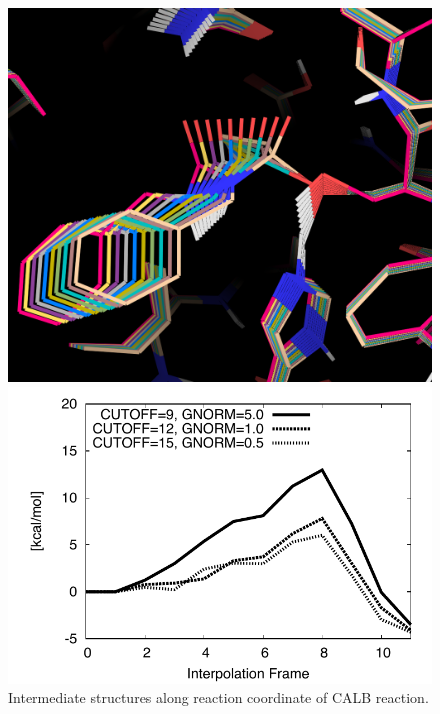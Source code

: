 \begin{figure}[htbp] 
\centering
\begin{minipage}{0.43\linewidth}
\includegraphics[width=0.90\linewidth]{wt-ini.png}
\end{minipage}
\begin{minipage}{0.55\linewidth}
\includegraphics[width=1.00\linewidth]{calb-conv.pdf}
\end{minipage}
\caption{
Intermediate structures along reaction coordinate of CALB reaction.
}
\label{fig:calb_reaction}
\end{figure}



